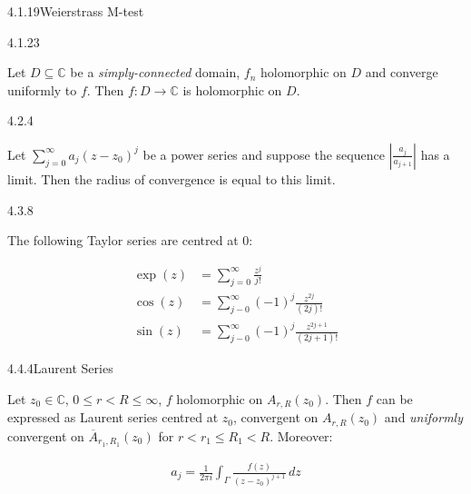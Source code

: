 \documentclass[10pt,landscape]{article}
\renewcommand{\leq}{\leqslant}
\begin{document}
\begin{multicols}{3}
\begin{lemma}{4.1.19}{Weierstrass M-test}
\end{lemma}

\begin{theorem}{4.1.23}{}

    Let $D \subseteq \mathbb{C}$ be a \emph{simply-connected} domain, $f_n$ holomorphic on $D$ and converge uniformly to $f$. Then $f: D \to \mathbb{C}$ is holomorphic on $D$.

\end{theorem}

\begin{theorem}{4.2.4}

    Let $\sum_{j=0}^{\infty} a_j (z - z_0)^j$ be a power series and suppose the sequence $\left| \frac{a_j}{a_{j+1}} \right|$ has a limit. Then the radius of convergence is equal to this limit.

\end{theorem}

\begin{exercise}{4.3.8}{}

    The following Taylor series are centred at $0$:

    \begin{align*}
        \exp(z) &= \sum_{j=0}^{\infty} \frac{z^j}{j!} \\
        \cos(z) &= \sum_{j-0}^{\infty} (-1)^j \frac{z^{2j}}{(2j)!} \\
        \sin(z) &= \sum_{j-0}^{\infty} (-1)^j \frac{z^{2j + 1}}{(2j + 1)!}
    \end{align*}

\end{exercise}

\begin{theorem}{4.4.4}{Laurent Series}

    Let $z_0 \in \mathbb{C}$, $0 \leq r < R \leq \infty$, $f$ holomorphic on $A_{r,R}(z_0)$. Then $f$ can be expressed as Laurent series centred at $z_0$, convergent on $A_{r,R}(z_0)$ and \emph{uniformly} convergent on $\overline{A}_{r_1,R_1}(z_0)$ for $r < r_1 \leq R_1 < R$. Moreover:

        \begin{align*}
            a_j = \frac{1}{2 \pi i} \int_{\Gamma} \frac{f(z)}{(z - z_0)^{j+1}} \,dz
        \end{align*}

\end{theorem}


\end{multicols}
\end{document}
